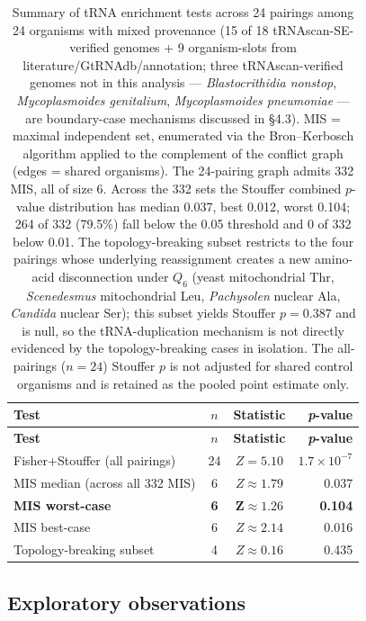 \documentclass[preprint,11pt,authoryear,a4paper]{elsarticle}
\begin{document}
\begin{longtable}[]{@{}lccr@{}}
\caption{Summary of tRNA enrichment tests across 24 pairings among 24
organisms with mixed provenance (15 of 18 tRNAscan-SE-verified genomes +
9 organism-slots from literature/GtRNAdb/annotation; three
tRNAscan-verified genomes not in this analysis --- \emph{Blastocrithidia
nonstop}, \emph{Mycoplasmoides genitalium}, \emph{Mycoplasmoides
pneumoniae} --- are boundary-case mechanisms discussed in §4.3). MIS =
maximal independent set, enumerated via the Bron--Kerbosch algorithm
applied to the complement of the conflict graph (edges = shared
organisms). The 24-pairing graph admits 332 MIS, all of size 6. Across
the 332 sets the Stouffer combined \(p\)-value distribution has median
0.037, best 0.012, worst 0.104; 264 of 332 (79.5\%) fall below the 0.05
threshold and 0 of 332 below 0.01. The topology-breaking subset
restricts to the four pairings whose underlying reassignment creates a
new amino-acid disconnection under \(Q_{6}\) (yeast mitochondrial Thr,
\emph{Scenedesmus} mitochondrial Leu, \emph{Pachysolen} nuclear Ala,
\emph{Candida} nuclear Ser); this subset yields Stouffer \(p = 0.387\)
and is null, so the tRNA-duplication mechanism is not directly evidenced
by the topology-breaking cases in isolation. The all-pairings
(\(n = 24\)) Stouffer \(p\) is not adjusted for shared control organisms
and is retained as the pooled point estimate only.}\tabularnewline
\toprule\noalign{}
\textbf{Test} & \textbf{\(n\)} & \textbf{Statistic} &
\textbf{\emph{p}-value} \\
\midrule\noalign{}
\endfirsthead
\toprule\noalign{}
\textbf{Test} & \textbf{\(n\)} & \textbf{Statistic} &
\textbf{\emph{p}-value} \\
\midrule\noalign{}
\endhead
\bottomrule\noalign{}
\endlastfoot
Fisher+Stouffer (all pairings) & 24 & \(Z = 5.10\) &
\(1.7 \times 10^{- 7}\) \\
MIS median (across all 332 MIS) & 6 & \(Z \approx 1.79\) & 0.037 \\
\textbf{MIS worst-case} & \textbf{6} & \(\mathbf{Z \approx 1.26}\) &
\textbf{0.104} \\
MIS best-case & 6 & \(Z \approx 2.14\) & 0.016 \\
Topology-breaking subset & 4 & \(Z \approx 0.16\) & 0.435 \\
\end{longtable}

\protect{}\label{tbl:trna-tests}{}

\subsection{Exploratory observations}\label{sec:res-exploratory}
\end{document}
